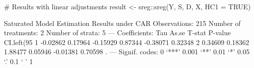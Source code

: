 \documentclass{article}
\begin{document}
\begin{rcode}
# Results with linear adjustments
result <- sreg::sreg(Y, S, D, X, HC1 = TRUE)

Saturated Model Estimation Results under CAR
Observations: 215 
Number of treatments: 2 
Number of strata: 5 
---
Coefficients:
       Tau   As.se   T-stat P-value CI.left(95%
1 -0.02862 0.17964 -0.15929 0.87344     -0.38071       0.32348             
2  0.34609 0.18362  1.88477 0.05946     -0.01381       0.70598            .
---
Signif. codes:  0 ‘***’ 0.001 ‘**’ 0.01 ‘*’ 0.05 ‘.’ 0.1 ‘ ’ 1
\end{rcode}
\end{document}
